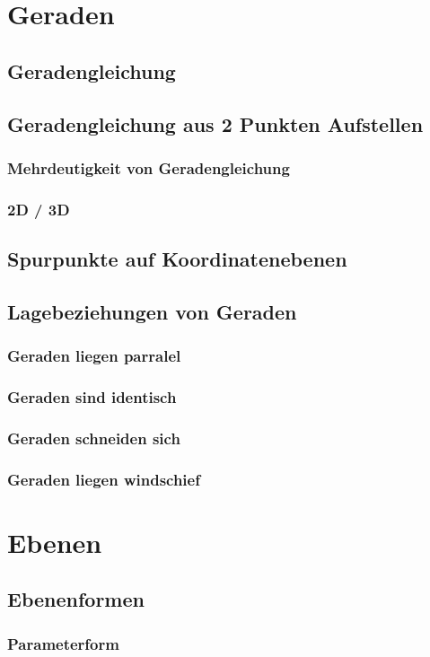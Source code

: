 \section{Geraden}
\subsection{Geradengleichung}
\subsection{Geradengleichung aus 2 Punkten Aufstellen}
\subsubsection{Mehrdeutigkeit von Geradengleichung}
\subsubsection{2D / 3D}
\subsection{Spurpunkte auf Koordinatenebenen}
\subsection{Lagebeziehungen von Geraden}
\subsubsection{Geraden liegen parralel}
\subsubsection{Geraden sind identisch}
\subsubsection{Geraden schneiden sich}
\subsubsection{Geraden liegen windschief}

\section{Ebenen}
\subsection{Ebenenformen}
\subsubsection{Parameterform}
